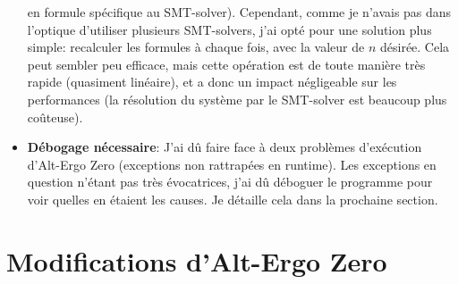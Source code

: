 \documentclass[a4paper]{article}%
\begin{document}
\begin{itemize}
		en formule spécifique au SMT-solver). Cependant, comme je n'avais pas dans l'optique d'utiliser plusieurs SMT-solvers, j'ai opté pour une solution plus simple:
		recalculer les formules à chaque fois, avec la valeur de $n$ désirée. Cela peut sembler peu efficace, mais cette opération est de toute manière très rapide
		(quasiment linéaire), et a donc un impact négligeable sur les performances (la résolution du système par le SMT-solver est beaucoup plus coûteuse).\\
		\item \textbf{Débogage nécessaire}: J'ai dû faire face à deux problèmes d'exécution d'Alt-Ergo Zero (exceptions non rattrapées en runtime). Les exceptions en question n'étant pas
		très évocatrices, j'ai dû déboguer le programme pour voir quelles en étaient les causes. Je détaille cela dans la prochaine section.
	\end{itemize}

	\section{Modifications d'Alt-Ergo Zero}
\end{document}
